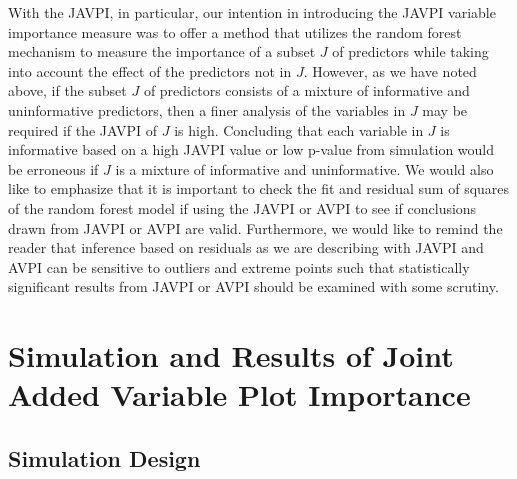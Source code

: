 \documentclass[12pt,twoside]{reedthesis}
\theoremstyle{definition}
\theoremstyle{definition}
\theoremstyle{definition}
\theoremstyle{remark}
\begin{document}
With the JAVPI, in particular, our intention in introducing the JAVPI
variable importance measure was to offer a method that utilizes the
random forest mechanism to measure the importance of a subset \(J\) of
predictors while taking into account the effect of the predictors not in
\(J\). However, as we have noted above, if the subset \(J\) of
predictors consists of a mixture of informative and uninformative
predictors, then a finer analysis of the variables in \(J\) may be
required if the JAVPI of \(J\) is high. Concluding that each variable in
\(J\) is informative based on a high JAVPI value or low p-value from
simulation would be erroneous if \(J\) is a mixture of informative and
uninformative. We would also like to emphasize that it is important to
check the fit and residual sum of squares of the random forest model if
using the JAVPI or AVPI to see if conclusions drawn from JAVPI or AVPI
are valid. Furthermore, we would like to remind the reader that
inference based on residuals as we are describing with JAVPI and AVPI
can be sensitive to outliers and extreme points such that statistically
significant results from JAVPI or AVPI should be examined with some
scrutiny. \par

\section{Simulation and Results of Joint Added Variable Plot
Importance}\label{simulation-and-results-of-joint-added-variable-plot-importance}

\subsection{Simulation Design}\label{simulation-design-1}
\end{document}

